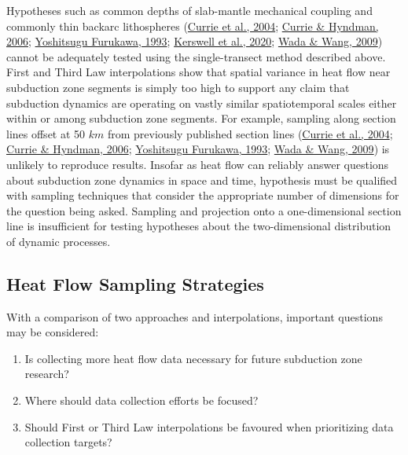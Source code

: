 \documentclass[draft,linenumbers]{agujournal2018}
\begin{document}
Hypotheses such as common depths of slab-mantle mechanical coupling and
commonly thin backarc lithospheres
(\protect\hyperlink{ref-currie2004}{Currie et al., 2004};
\protect\hyperlink{ref-currie2006}{Currie \& Hyndman, 2006};
\protect\hyperlink{ref-furukawa1993}{Yoshitsugu Furukawa, 1993};
\protect\hyperlink{ref-kerswell2020}{Kerswell et al., 2020};
\protect\hyperlink{ref-wada2009}{Wada \& Wang, 2009}) cannot be
adequately tested using the single-transect method described above.
First and Third Law interpolations show that spatial variance in heat
flow near subduction zone segments is simply too high to support any
claim that subduction dynamics are operating on vastly similar
spatiotemporal scales either within or among subduction zone segments.
For example, sampling along section lines offset at 50 \(km\) from
previously published section lines
(\protect\hyperlink{ref-currie2004}{Currie et al., 2004};
\protect\hyperlink{ref-currie2006}{Currie \& Hyndman, 2006};
\protect\hyperlink{ref-furukawa1993}{Yoshitsugu Furukawa, 1993};
\protect\hyperlink{ref-wada2009}{Wada \& Wang, 2009}) is unlikely to
reproduce results. Insofar as heat flow can reliably answer questions
about subduction zone dynamics in space and time, hypothesis must be
qualified with sampling techniques that consider the appropriate number
of dimensions for the question being asked. Sampling and projection onto
a one-dimensional section line is insufficient for testing hypotheses
about the two-dimensional distribution of dynamic processes.

\subsection{Heat Flow Sampling Strategies}

With a comparison of two approaches and interpolations, important
questions may be considered:

\begin{enumerate}
\def\labelenumi{\arabic{enumi}.}
\item
  Is collecting more heat flow data necessary for future subduction zone
  research?
\item
  Where should data collection efforts be focused?
\item
  Should First or Third Law interpolations be favoured when prioritizing
  data collection targets?
\end{enumerate}
\end{document}
